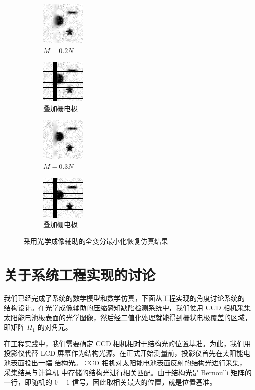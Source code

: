 \begin{figure}
\centering
\begin{subfigure}[h]{1.1in}
\includegraphics{Figure/L1/opt2.png}
\caption{$M = 0.2N$}
\end{subfigure}
\begin{subfigure}[h]{1.1in}
\includegraphics{Figure/L1/opt2f.png}
\caption{叠加栅电极}
\end{subfigure}
\begin{subfigure}[h]{1.1in}
\includegraphics{Figure/L1/opt3.png}
\caption{$M = 0.3N$}
\end{subfigure}
\begin{subfigure}[h]{1.1in}
\includegraphics{Figure/L1/opt3f.png}
\caption{叠加栅电极}
\end{subfigure}
\caption{采用光学成像辅助的全变分最小化恢复仿真结果}
\label{fig:optl1}
\end{figure}

\section{关于系统工程实现的讨论}

我们已经完成了系统的数学模型和数学仿真，下面从工程实现的角度讨论系统的
结构设计。在光学成像辅助的压缩感知缺陷检测系统中，我们使用 CCD 相机采集
太阳能电池板表面的光学图像，然后经二值化处理就能得到栅状电极覆盖的区域，
即矩阵 $H_1$ 的对角元。

在工程实践中，我们需要确定 CCD 相机相对于结构光的位置基准。为此，我们用
投影仪代替 LCD
屏幕作为结构光源。在正式开始测量前，投影仪首先在太阳能电池表面投出一幅
结构光。 CCD 相机对太阳能电池表面反射的结构光进行采集，采集结果与计算机
中存储的结构光进行相关匹配。由于结构光是 Bernoulli 矩阵的一行，即随机的
$0-1$ 信号，因此取相关最大的位置，就是位置基准。

